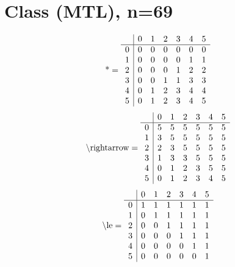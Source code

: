 \documentclass[11pt]{article}
\begin{document}
\section{Class (MTL), n=69}
\[\text{*} = 
\begin{array}{r | r r r r r r}
 & 0 & 1 & 2 & 3 & 4 & 5 \\ \hline
0 & 0 & 0 & 0 & 0 & 0 & 0 \\
1 & 0 & 0 & 0 & 0 & 1 & 1 \\
2 & 0 & 0 & 0 & 1 & 2 & 2 \\
3 & 0 & 0 & 1 & 1 & 3 & 3 \\
4 & 0 & 1 & 2 & 3 & 4 & 4 \\
5 & 0 & 1 & 2 & 3 & 4 & 5 \\
\end{array}
\]
\[\text{\textbackslash rightarrow} = 
\begin{array}{r | r r r r r r}
 & 0 & 1 & 2 & 3 & 4 & 5 \\ \hline
0 & 5 & 5 & 5 & 5 & 5 & 5 \\
1 & 3 & 5 & 5 & 5 & 5 & 5 \\
2 & 2 & 3 & 5 & 5 & 5 & 5 \\
3 & 1 & 3 & 3 & 5 & 5 & 5 \\
4 & 0 & 1 & 2 & 3 & 5 & 5 \\
5 & 0 & 1 & 2 & 3 & 4 & 5 \\
\end{array}
\]
\[\text{\textbackslash le} = 
\begin{array}{r | r r r r r r}
 & 0 & 1 & 2 & 3 & 4 & 5 \\ \hline
0 & 1 & 1 & 1 & 1 & 1 & 1 \\
1 & 0 & 1 & 1 & 1 & 1 & 1 \\
2 & 0 & 0 & 1 & 1 & 1 & 1 \\
3 & 0 & 0 & 0 & 1 & 1 & 1 \\
4 & 0 & 0 & 0 & 0 & 1 & 1 \\
5 & 0 & 0 & 0 & 0 & 0 & 1 \\
\end{array}
\]
\end{document}
